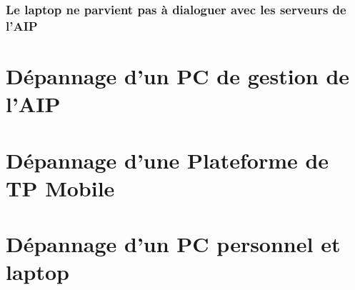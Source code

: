 \documentclass[a4paper]{article}
\begin{document}
\subsubsection{Le laptop ne parvient pas à dialoguer avec les serveurs de l'AIP}
		

\section{Dépannage d'un PC de gestion de l'AIP}

\section{Dépannage d'une Plateforme de TP Mobile}

\section{Dépannage d'un PC personnel et laptop}
\end{document}
